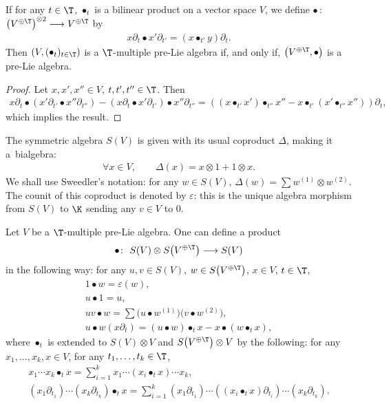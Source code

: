 \begin{Lemma}
If for any $t\in \T$, $\bullet_t$ is a bilinear product on a vector space $V$,
we define $\bullet\,{:}$ $\big(V^{\oplus \T}\big)^{\otimes 2}\longrightarrow V^{\oplus \T}$ by
\begin{gather*}
x\partial_t \bullet x'\partial_{t'}=(x\bullet_{t'} y)\partial_t.
\end{gather*}
Then $(V,(\bullet_t)_{t\in \T})$ is a $\T$-multiple pre-Lie algebra if,
and only if, $\big(V^{\oplus \T},\bullet\big)$ is a pre-Lie algebra.
\end{Lemma}

\begin{proof}
Let $x,x',x''\in V$, $t,t',t''\in \T$. Then
\begin{gather*}
x\partial_t\bullet (x'\partial_{t'}\bullet x''\partial_{t''})-(x\partial_t\bullet x'\partial_{t'})\bullet x''\partial_{t''}
=\left((x\bullet_{t'} x')\bullet_{t''} x''-x\bullet_{t'}(x'\bullet_{t''}x'')\right)\partial_t,
\end{gather*}
which implies the result.
\end{proof}

\begin{Notation}
The symmetric algebra $S(V)$ is given with its usual coproduct $\Delta$, making it a~bialgebra:
\begin{gather*}
\forall x\in V,\qquad \Delta(x)=x\otimes 1+1\otimes x.
\end{gather*}
We shall use Sweedler's notation: for any $w\in S(V)$, $\Delta(w)=\sum w^{(1)}\otimes w^{(2)}$.
The counit of this coproduct is denoted by $\varepsilon$: this is the unique algebra morphism from $S(V)$ to $\K$ sending any $v\in V$ to $0$.
\end{Notation}

\begin{Theorem}
Let $V$ be a $\T$-multiple pre-Lie algebra. One can define a product
\begin{gather*}
\bullet\colon\ S(V)\otimes S\big(V^{\oplus\T}\big)\longrightarrow S(V)
\end{gather*}
in the following way: for any $u,v \in S(V)$, $w\in S\big(V^{\oplus\T}\big)$, $x\in V$, $t\in \T$,
\begin{gather*}
1\bullet w=\varepsilon(w),
\\
u\bullet 1=u,
\\
uv\bullet w=\sum\big(u\bullet w^{(1)}\big)\big(v\bullet w^{(2)}\big),
\\
u\bullet w (x\partial_t)=(u\bullet w)\bullet_t x-x\bullet (w\bullet_t x),
\end{gather*}
where $\bullet_t$ is extended to $S(V)\otimes V$ and $S\big(V^{\oplus\T}\big)\otimes V$
by the following: for any $x_1,\dots,x_k,x\in V$, for any $t_1,\dots,t_k \in \T$,
\begin{gather*}
x_1\cdots x_k \bullet_t x=\sum_{i=1}^k x_1\cdots (x_i\bullet_t x)\cdots x_k,
\\
(x_1\partial_{t_1})\cdots (x_k\partial_{t_k}) \bullet_t x
=\sum_{i=1}^k (x_1\partial_{t_1})\cdots ((x_i\bullet_t x)\partial_{t_i})\cdots (x_k\partial_{t_k}).
\end{gather*}
\end{Theorem}

